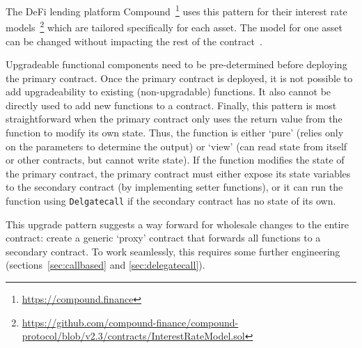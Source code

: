 The DeFi lending platform Compound~\footnote{\url{https://compound.finance}} uses this pattern for their interest rate models~\footnote{\url{https://github.com/compound-finance/compound-protocol/blob/v2.3/contracts/InterestRateModel.sol}} which are tailored specifically for each asset. The model for one asset can be changed without impacting the rest of the contract~\cite{openzeppelinPost}.

Upgradeable functional components need to be pre-determined before deploying the primary contract. Once the primary contract is deployed, it is not possible to add upgradeability to existing (non-upgradable) functions. It also cannot be directly used to add new functions to a contract. Finally, this pattern is most straightforward when the primary contract only uses the return value from the function to modify its own state. Thus, the function is either `pure' (relies only on the parameters to determine the output) or `view' (can read state from itself or other contracts, but cannot write state). If the function modifies the state of the primary contract, the primary contract must either expose its state variables to the secondary contract (by implementing setter functions), or it can run the function using \texttt{Delgatecall} if the secondary contract has no state of its own. 

This upgrade pattern suggests a way forward for wholesale changes to the entire contract: create a generic `proxy' contract that forwards all functions to a secondary contract. To work seamlessly, this requires some further engineering (sections~\ref{sec:callbased} and \ref{sec:delegatecall}).





